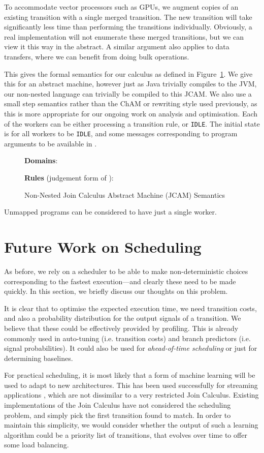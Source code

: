 \documentclass{eptcs}
\begin{document}
To accommodate vector processors such as GPUs, we augment  copies of an existing transition with a single merged transition.
The new transition will take significantly less time than performing the  transitions individually.
Obviously, a real implementation will not enumerate these merged transitions, but we can view it this way in the abstract.
A similar argument also applies to data transfers, where we can benefit from doing bulk operations.

This gives the formal semantics for our calculus as defined in Figure~\ref{fig:semantics}.
We give this for an abstract machine, however just as Java trivially compiles to the JVM, our non-nested language can trivially be compiled to this JCAM. 
We also use a small step semantics rather than the ChAM \cite{Fournet1996} or rewriting \cite{Odersky2000} style used previously, as this is more appropriate for our ongoing work on analysis and optimisation.
Each of the workers can be either processing a transition rule, or \texttt{IDLE}.
The initial state is for all workers to be \texttt{IDLE}, and some messages corresponding to program arguments to be available in .
\begin{figure}
  \small
  \textbf{Domains}:
  
  
  \textbf{Rules} (judgement form of ):
  
  \caption{Non-Nested Join Calculus Abstract Machine (JCAM) Semantics}\label{fig:semantics}
\end{figure}
Unmapped programs can be considered to have just a single worker.

\section{Future Work on Scheduling}\label{sec:scheduling}
As before, we rely on a scheduler to be able to make non-deterministic
choices corresponding to the fastest execution---and clearly these need to be
made quickly. In this section, we briefly discuss our thoughts on this problem.

It is clear that to optimise the expected execution time, we need transition
costs, and also a probability distribution for the output signals of a
transition. We believe that these could be effectively provided by profiling.
This is already commonly used in auto-tuning (i.e. transition costs) and branch
predictors (i.e. signal probabilities). It could also be used for {\em
ahead-of-time scheduling} or just for determining baselines.

For practical scheduling, it is most likely that a form of machine learning will be used to adapt to new architectures.
This has been used successfully for streaming applications \cite{Wang2010}, which are not dissimilar to a very restricted Join Calculus.
Existing implementations of the Join Calculus have not considered the
scheduling problem, and simply pick the first transition found to match. In
order to maintain this simplicity, we would consider whether the output of such
a learning algorithm could be a priority list of transitions, that evolves over time to offer some load balancing.
\end{document}
